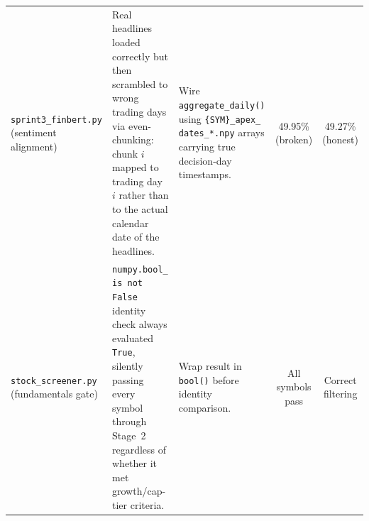 \begin{table}[htbp]
\begin{tabular}{p{2.8cm} p{4.5cm} p{3.5cm} c c}
\addlinespace
\texttt{sprint3\_finbert.py} \newline (sentiment alignment) &
  Real headlines loaded correctly but then scrambled to wrong
  trading days via even-chunking: chunk $i$ mapped to trading
  day $i$ rather than to the actual calendar date of the headlines. &
  Wire \texttt{aggregate\_daily()} using \texttt{\{SYM\}\_apex\_ dates\_*.npy}
  arrays carrying true decision-day timestamps. &
  49.95\% \newline (broken) &
  49.27\% \newline (honest) \\

\addlinespace
\texttt{stock\_screener.py} \newline (fundamentals gate) &
  \texttt{numpy.bool\_ is not False} identity check always evaluated
  \texttt{True}, silently passing every symbol through Stage~2
  regardless of whether it met growth/cap-tier criteria. &
  Wrap result in \texttt{bool()} before identity comparison. &
  All symbols pass &
  Correct filtering \\

\bottomrule
\end{tabular}
\end{table}


